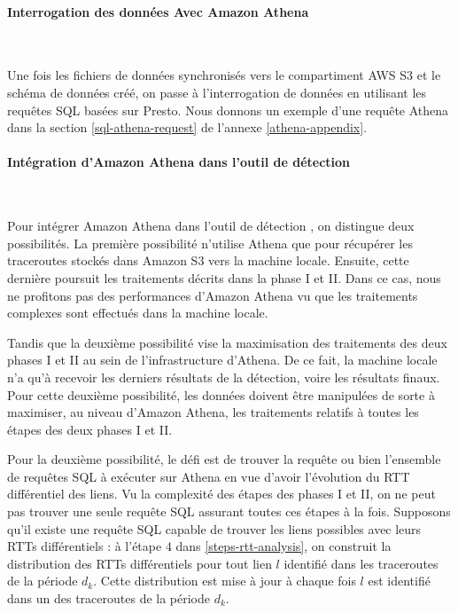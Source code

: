 \paragraph{Interrogation des données Avec Amazon Athena}~

Une fois les fichiers de données  synchronisés vers le compartiment AWS S3 et le schéma  de données  créé, on passe à l'interrogation de données en utilisant les requêtes SQL basées sur Presto.  
Nous donnons un exemple d'une requête Athena dans la section \ref{sql-athena-request} de l'annexe \ref{athena-appendix}.

\paragraph{Intégration d'Amazon Athena dans l'outil de détection}~ \label{integration-aws-possibilite-une}
 

Pour intégrer Amazon Athena dans l'outil de détection \cite{InternetHealthReport}, on distingue deux possibilités. La première possibilité n'utilise Athena que pour récupérer  les traceroutes stockés dans Amazon S3 vers  la machine locale. Ensuite, cette dernière poursuit les traitements  décrits dans la phase I et II. Dans ce cas, nous ne profitons pas  des performances d'Amazon Athena vu que les traitements complexes sont effectués dans la machine locale.

Tandis que  la deuxième possibilité vise la maximisation des traitements des deux phases I et II au sein de l'infrastructure  d'Athena. De ce fait, la machine locale n'a qu'à recevoir les derniers résultats de la détection, voire les résultats finaux. Pour cette deuxième possibilité, les données doivent être manipulées de sorte à maximiser,  	au niveau d'Amazon Athena,  les traitements relatifs à toutes les étapes des deux phases I et II. 

Pour la deuxième possibilité, le défi est de trouver la requête ou bien l'ensemble de requêtes SQL à exécuter sur Athena en vue d'avoir l'évolution du RTT différentiel des liens. 
Vu la complexité des  étapes des phases I et II, on ne peut pas trouver une seule requête SQL assurant toutes ces étapes à la fois. Supposons qu'il existe une requête SQL capable de trouver les liens possibles avec leurs RTTs différentiels : à l'étape $ 4 $ dans \ref{steps-rtt-analysis}, on construit la distribution des RTTs différentiels pour tout lien $l$ identifié dans les traceroutes de la période $d_k$. Cette distribution est mise à jour à chaque fois $l$ est identifié dans un des traceroutes  de la période $d_k$. 

